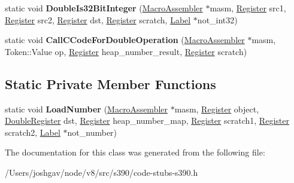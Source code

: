 \begin{DoxyCompactItemize}
\item 
static void {\bfseries Double\+Is32\+Bit\+Integer} (\hyperlink{classv8_1_1internal_1_1_macro_assembler}{Macro\+Assembler} $\ast$masm, \hyperlink{structv8_1_1internal_1_1_register}{Register} src1, \hyperlink{structv8_1_1internal_1_1_register}{Register} src2, \hyperlink{structv8_1_1internal_1_1_register}{Register} dst, \hyperlink{structv8_1_1internal_1_1_register}{Register} scratch, \hyperlink{classv8_1_1internal_1_1_label}{Label} $\ast$not\+\_\+int32)\hypertarget{classv8_1_1internal_1_1_floating_point_helper_a3218a2cdcb2adf065e51a064fcdb9a5d}{}\label{classv8_1_1internal_1_1_floating_point_helper_a3218a2cdcb2adf065e51a064fcdb9a5d}

\item 
static void {\bfseries Call\+C\+Code\+For\+Double\+Operation} (\hyperlink{classv8_1_1internal_1_1_macro_assembler}{Macro\+Assembler} $\ast$masm, Token\+::\+Value op, \hyperlink{structv8_1_1internal_1_1_register}{Register} heap\+\_\+number\+\_\+result, \hyperlink{structv8_1_1internal_1_1_register}{Register} scratch)\hypertarget{classv8_1_1internal_1_1_floating_point_helper_aa4389e8daf1c2b77007651cf26a45730}{}\label{classv8_1_1internal_1_1_floating_point_helper_aa4389e8daf1c2b77007651cf26a45730}

\end{DoxyCompactItemize}
\subsection*{Static Private Member Functions}
\begin{DoxyCompactItemize}
\item 
static void {\bfseries Load\+Number} (\hyperlink{classv8_1_1internal_1_1_macro_assembler}{Macro\+Assembler} $\ast$masm, \hyperlink{structv8_1_1internal_1_1_register}{Register} object, \hyperlink{structv8_1_1internal_1_1_double_register}{Double\+Register} dst, \hyperlink{structv8_1_1internal_1_1_register}{Register} heap\+\_\+number\+\_\+map, \hyperlink{structv8_1_1internal_1_1_register}{Register} scratch1, \hyperlink{structv8_1_1internal_1_1_register}{Register} scratch2, \hyperlink{classv8_1_1internal_1_1_label}{Label} $\ast$not\+\_\+number)\hypertarget{classv8_1_1internal_1_1_floating_point_helper_a3088039548f544a623b32eb044e76d98}{}\label{classv8_1_1internal_1_1_floating_point_helper_a3088039548f544a623b32eb044e76d98}

\end{DoxyCompactItemize}


The documentation for this class was generated from the following file\+:\begin{DoxyCompactItemize}
\item 
/\+Users/joshgav/node/v8/src/s390/code-\/stubs-\/s390.\+h\end{DoxyCompactItemize}
